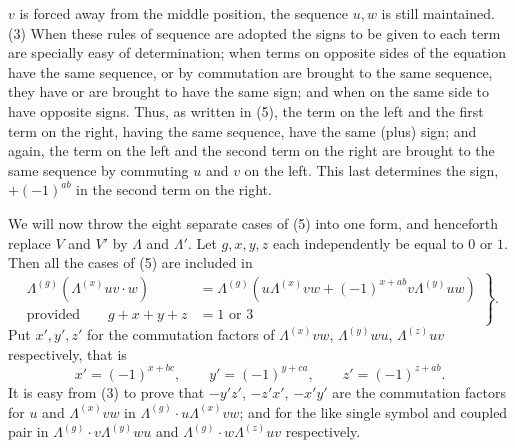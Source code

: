 \documentclass[11pt]{article}
\begin{document}
$v$ is forced away from the middle position, the sequence $u,w$ is still maintained. (3) When these rules of sequence are adopted the signs to be given to each term are specially easy of determination; when terms on opposite sides of the equation have the same sequence, or by commutation are brought to the same sequence, they have or are brought to have the same sign; and when on the same side to have opposite signs. Thus, as written in (5), the term on the left and the first term on the right, having the same sequence, have the same (plus) sign; and again, the term on the left and the second term on the right are brought to the same sequence by commuting $u$ and $v$ on the left. This last determines the sign, $+(-1)^{ab}$ in the second term on the right.

\indent We will now throw the eight separate cases of (5) into one form, and henceforth replace $V$ and $V'$ by $\Lambda$ and $\Lambda'$. Let $g,x,y,z$ each independently be equal to $0$ or $1$. Then all the cases of (5) are included in
\begin{equation}\left.\begin{aligned}
\Lambda^{(g)}(\Lambda^{(x)}uv\cdot w)&=\Lambda^{(g)}(u\Lambda^{(x)}vw+(-1)^{x+ab}v\Lambda^{(y)}uw)\\
\text{provided}\qquad g+x+y+z&=1\text{ or }3
\end{aligned}\right\}.\tag{6}\end{equation}
Put $x',y',z'$ for the commutation factors of $\Lambda^{(x)}vw$, $\Lambda^{(y)}wu$, $\Lambda^{(z)}uv$ respectively, that is
\begin{equation}x'=(-1)^{x+bc},\qquad y'=(-1)^{y+ca},\qquad z'=(-1)^{z+ab}.\tag{7}\end{equation}
It is easy from (3) to prove that $-y'z'$, $-z'x'$, $-x'y'$ are the commutation factors for $u$ and $\Lambda^{(x)}vw$ in $\Lambda^{(g)}\cdot u\Lambda^{(x)}vw$; and for the like single symbol and coupled pair in $\Lambda^{(g)}\cdot v\Lambda^{(y)}wu$ and $\Lambda^{(g)}\cdot w\Lambda^{(z)}uv$ respectively.
\end{document}
